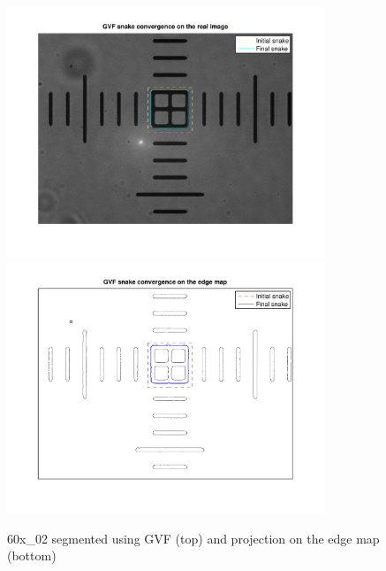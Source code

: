 \documentclass{article}
\begin{document}
\begin{figure}
\centering
\includegraphics[width=0.85\textwidth]{figures/gvf_1p1.pdf}
\includegraphics[width=0.85\textwidth]{figures/gvf_1p1_edge.pdf}
\caption{60x\_02 segmented using GVF (top) and projection on the edge map (bottom)}
\label{fig:gvf1p1}
\end{figure}
\end{document}
